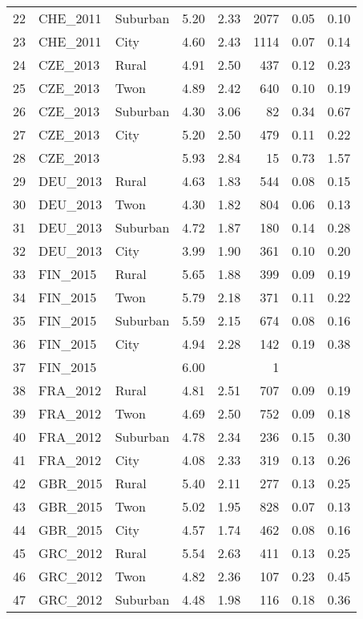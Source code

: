 \documentclass[12pt, titlepage]{article}
\begin{document}
\begin{table}[ht]
\begin{tabular}{rllrrrrr}
		22 & CHE\_2011 & Suburban & 5.20 & 2.33 & 2077 & 0.05 & 0.10 \\ 
		23 & CHE\_2011 & City & 4.60 & 2.43 & 1114 & 0.07 & 0.14 \\ 
		24 & CZE\_2013 & Rural & 4.91 & 2.50 & 437 & 0.12 & 0.23 \\ 
		25 & CZE\_2013 & Twon & 4.89 & 2.42 & 640 & 0.10 & 0.19 \\ 
		26 & CZE\_2013 & Suburban & 4.30 & 3.06 &  82 & 0.34 & 0.67 \\ 
		27 & CZE\_2013 & City & 5.20 & 2.50 & 479 & 0.11 & 0.22 \\ 
		28 & CZE\_2013 &  & 5.93 & 2.84 &  15 & 0.73 & 1.57 \\ 
		29 & DEU\_2013 & Rural & 4.63 & 1.83 & 544 & 0.08 & 0.15 \\ 
		30 & DEU\_2013 & Twon & 4.30 & 1.82 & 804 & 0.06 & 0.13 \\ 
		31 & DEU\_2013 & Suburban & 4.72 & 1.87 & 180 & 0.14 & 0.28 \\ 
		32 & DEU\_2013 & City & 3.99 & 1.90 & 361 & 0.10 & 0.20 \\ 
		33 & FIN\_2015 & Rural & 5.65 & 1.88 & 399 & 0.09 & 0.19 \\ 
		34 & FIN\_2015 & Twon & 5.79 & 2.18 & 371 & 0.11 & 0.22 \\ 
		35 & FIN\_2015 & Suburban & 5.59 & 2.15 & 674 & 0.08 & 0.16 \\ 
		36 & FIN\_2015 & City & 4.94 & 2.28 & 142 & 0.19 & 0.38 \\ 
		37 & FIN\_2015 &  & 6.00 &  &   1 &  &  \\ 
		38 & FRA\_2012 & Rural & 4.81 & 2.51 & 707 & 0.09 & 0.19 \\ 
		39 & FRA\_2012 & Twon & 4.69 & 2.50 & 752 & 0.09 & 0.18 \\ 
		40 & FRA\_2012 & Suburban & 4.78 & 2.34 & 236 & 0.15 & 0.30 \\ 
		41 & FRA\_2012 & City & 4.08 & 2.33 & 319 & 0.13 & 0.26 \\ 
		42 & GBR\_2015 & Rural & 5.40 & 2.11 & 277 & 0.13 & 0.25 \\ 
		43 & GBR\_2015 & Twon & 5.02 & 1.95 & 828 & 0.07 & 0.13 \\ 
		44 & GBR\_2015 & City & 4.57 & 1.74 & 462 & 0.08 & 0.16 \\ 
		45 & GRC\_2012 & Rural & 5.54 & 2.63 & 411 & 0.13 & 0.25 \\ 
		46 & GRC\_2012 & Twon & 4.82 & 2.36 & 107 & 0.23 & 0.45 \\ 
		47 & GRC\_2012 & Suburban & 4.48 & 1.98 & 116 & 0.18 & 0.36 \\ 

\end{tabular}
\end{table}
\end{document}
